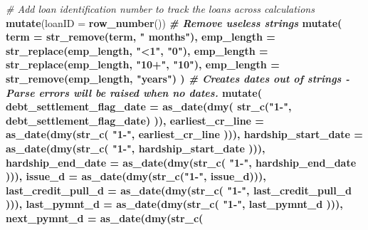 \documentclass[11pt,]{report}
\newenvironment{Shaded}{\begin{snugshade}}{\end{snugshade}}
\newcommand{\CommentTok}[1]{\textcolor[rgb]{0.56,0.35,0.01}{\textit{#1}}}
\newcommand{\DataTypeTok}[1]{\textcolor[rgb]{0.13,0.29,0.53}{#1}}
\newcommand{\KeywordTok}[1]{\textcolor[rgb]{0.13,0.29,0.53}{\textbf{#1}}}
\newcommand{\NormalTok}[1]{#1}
\newcommand{\OperatorTok}[1]{\textcolor[rgb]{0.81,0.36,0.00}{\textbf{#1}}}
\newcommand{\StringTok}[1]{\textcolor[rgb]{0.31,0.60,0.02}{#1}}
\begin{document}
\begin{Shaded}
\begin{Highlighting}[numbers=left,,]
{\StringTok{    }\CommentTok{# Add loan identification number to track the loans across calculations}
\StringTok{    }\KeywordTok{mutate}\NormalTok{(}\DataTypeTok{loanID =} \KeywordTok{row_number}\NormalTok{()) }\OperatorTok{%
\StringTok{    }
\StringTok{    }\CommentTok{# Remove useless strings}
\StringTok{    }\KeywordTok{mutate}\NormalTok{(}
      \DataTypeTok{term       =} \KeywordTok{str_remove}\NormalTok{(term, }\StringTok{" months"}\NormalTok{),}
      \DataTypeTok{emp_length =} \KeywordTok{str_replace}\NormalTok{(emp_length, }\StringTok{"<1"}\NormalTok{, }\StringTok{"0"}\NormalTok{),}
      \DataTypeTok{emp_length =} \KeywordTok{str_replace}\NormalTok{(emp_length, }\StringTok{"10+"}\NormalTok{, }\StringTok{"10"}\NormalTok{),}
      \DataTypeTok{emp_length =} \KeywordTok{str_remove}\NormalTok{(emp_length, }\StringTok{"years"}\NormalTok{)}
\NormalTok{    ) }\OperatorTok{%
\StringTok{    }
\StringTok{    }\CommentTok{# Creates dates out of strings - Parse errors will be raised when no dates.}
\StringTok{    }\KeywordTok{mutate}\NormalTok{(}
      \DataTypeTok{debt_settlement_flag_date =} \KeywordTok{as_date}\NormalTok{(}\KeywordTok{dmy}\NormalTok{(}
        \KeywordTok{str_c}\NormalTok{(}\StringTok{"1-"}\NormalTok{, debt_settlement_flag_date)}
\NormalTok{      )),}
      \DataTypeTok{earliest_cr_line          =} \KeywordTok{as_date}\NormalTok{(}\KeywordTok{dmy}\NormalTok{(}\KeywordTok{str_c}\NormalTok{(}
        \StringTok{"1-"}\NormalTok{, earliest_cr_line}
\NormalTok{      ))),}
      \DataTypeTok{hardship_start_date       =} \KeywordTok{as_date}\NormalTok{(}\KeywordTok{dmy}\NormalTok{(}\KeywordTok{str_c}\NormalTok{(}
        \StringTok{"1-"}\NormalTok{, hardship_start_date}
\NormalTok{      ))),}
      \DataTypeTok{hardship_end_date         =} \KeywordTok{as_date}\NormalTok{(}\KeywordTok{dmy}\NormalTok{(}\KeywordTok{str_c}\NormalTok{(}
        \StringTok{"1-"}\NormalTok{, hardship_end_date}
\NormalTok{      ))),}
      \DataTypeTok{issue_d                   =} \KeywordTok{as_date}\NormalTok{(}\KeywordTok{dmy}\NormalTok{(}\KeywordTok{str_c}\NormalTok{(}\StringTok{"1-"}\NormalTok{, issue_d))),}
      \DataTypeTok{last_credit_pull_d        =} \KeywordTok{as_date}\NormalTok{(}\KeywordTok{dmy}\NormalTok{(}\KeywordTok{str_c}\NormalTok{(}
        \StringTok{"1-"}\NormalTok{, last_credit_pull_d}
\NormalTok{      ))),}
      \DataTypeTok{last_pymnt_d              =} \KeywordTok{as_date}\NormalTok{(}\KeywordTok{dmy}\NormalTok{(}\KeywordTok{str_c}\NormalTok{(}
        \StringTok{"1-"}\NormalTok{, last_pymnt_d}
\NormalTok{      ))),}
      \DataTypeTok{next_pymnt_d              =} \KeywordTok{as_date}\NormalTok{(}\KeywordTok{dmy}\NormalTok{(}\KeywordTok{str_c}\NormalTok{(}
}}}
\end{Highlighting}
\end{Shaded}
\end{document}
